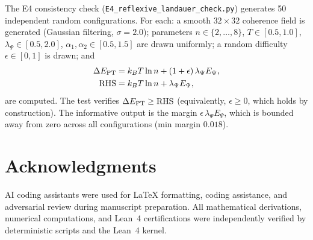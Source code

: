 \documentclass[11pt,twocolumn]{article}
\theoremstyle{remark}
\begin{document}
The E4 consistency check (\texttt{E4\_reflexive\_landauer\_check.py})
generates 50 independent random configurations. For each: a smooth
$32\times32$ coherence field is generated (Gaussian filtering,
$\sigma=2.0$); parameters $n \in \{2,\ldots,8\}$, $T \in [0.5,1.0]$,
$\lambda_\Psi \in [0.5,2.0]$, $\alpha_1,\alpha_2 \in [0.5,1.5]$ are
drawn uniformly; a random difficulty $\epsilon \in [0,1]$ is drawn; and
\begin{align*}
  \Delta E_{\rm PT} &= k_B T \ln n + (1+\epsilon)\,\lambda_\Psi E_\Psi,\\
  \mathrm{RHS} &= k_B T \ln n + \lambda_\Psi E_\Psi,
\end{align*}
are computed. The test verifies $\Delta E_{\rm PT} \geq \mathrm{RHS}$
(equivalently, $\epsilon \geq 0$, which holds by construction). The
informative output is the margin $\epsilon\,\lambda_\Psi E_\Psi$, which
is bounded away from zero across all configurations (min margin $0.018$).





\section*{Acknowledgments}

AI coding assistants were used for LaTeX formatting, coding assistance, and adversarial review during manuscript preparation. All mathematical derivations, numerical computations, and Lean~4 certifications were independently verified by deterministic scripts and the Lean~4 kernel.
\end{document}
